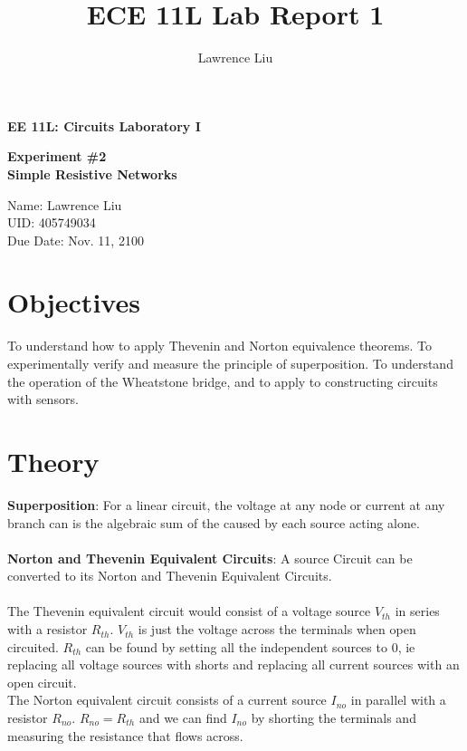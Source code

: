 \documentclass[12pt]{article}
\title{ECE 11L Lab Report 1}
\author{Lawrence Liu}
\begin{document}
\begin{titlepage}
   \begin{center}
       \vspace*{1cm}

       \textbf{EE 11L: Circuits Laboratory I}

       \vspace{2cm}

       \textbf{Experiment \#2}\\
       \textbf{Simple Resistive Networks}

            
       \vspace{4cm}
     
            
       Name: Lawrence Liu\\
		UID: 405749034\\
		Due Date: Nov. 11, 2100
            
   \end{center}
\end{titlepage}
\section*{Objectives}
To understand how to apply Thevenin and Norton equivalence theorems. To experimentally verify and measure the principle of superposition. To understand the operation of the Wheatstone bridge, and to apply to constructing circuits with sensors. 
\section*{Theory}
\textbf{Superposition}: For a linear circuit, the voltage at any node or current at any 
branch can is the algebraic sum of the caused by each source acting alone.\\\\
\textbf{Norton and Thevenin Equivalent Circuits}: A source Circuit can be converted to its Norton and Thevenin Equivalent Circuits.\\
\\
The Thevenin equivalent circuit would consist of a voltage source $V_{th}$ in series with a resistor $R_{th}$. $V_{th}$ is just the voltage across the terminals when open circuited. $R_{th}$ can be found by setting all the independent sources to $0$, ie replacing all voltage sources with shorts and replacing all current sources with an open circuit.
\\
The Norton equivalent circuit consists of a current source $I_{no}$ in parallel with a resistor $R_{no}$. $R_{no}=R_{th}$ and we can find $I_{no}$ by shorting the terminals and measuring the resistance that flows across.
\pagebreak
\end{document}
